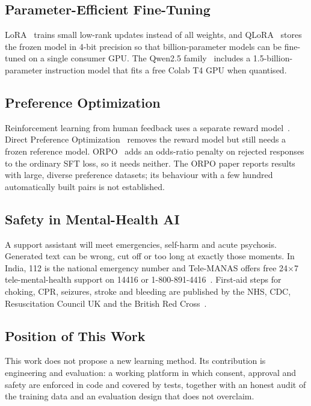 \documentclass[11pt,a4paper]{article}
\begin{document}
\subsection{Parameter-Efficient Fine-Tuning}
LoRA~\cite{hu2022} trains small low-rank updates instead of all weights, and QLoRA~\cite{dettmers2023}
stores the frozen model in 4-bit precision so that billion-parameter models can be fine-tuned on a
single consumer GPU. The Qwen2.5 family~\cite{qwen25report,qwenhf} includes a 1.5-billion-parameter
instruction model that fits a free Colab T4 GPU when quantised.

\subsection{Preference Optimization}
Reinforcement learning from human feedback uses a separate reward model~\cite{ouyang2022}. Direct
Preference Optimization~\cite{rafailov2023} removes the reward model but still needs a frozen reference
model. ORPO~\cite{hong2024} adds an odds-ratio penalty on rejected responses to the ordinary SFT loss,
so it needs neither. The ORPO paper reports results with large, diverse preference datasets; its
behaviour with a few hundred automatically built pairs is not established.

\subsection{Safety in Mental-Health AI}
A support assistant will meet emergencies, self-harm and acute psychosis. Generated text can be
wrong, cut off or too long at exactly those moments. In India, 112 is the national emergency number and
Tele-MANAS offers free 24$\times$7 tele-mental-health support on 14416 or 1-800-891-4416~\cite{telemanas}.
First-aid steps for choking, CPR, seizures, stroke and bleeding are published by the NHS, CDC,
Resuscitation Council UK and the British Red Cross~\cite{nhs,cdc,resus,redcross}.

\subsection{Position of This Work}
This work does not propose a new learning method. Its contribution is engineering and evaluation:
a working platform in which consent, approval and safety are enforced in code and covered by tests,
together with an honest audit of the training data and an evaluation design that does not overclaim.

\end{document}

